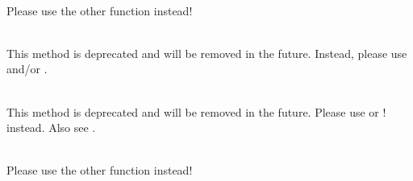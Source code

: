 \begin{DoxyRefList}
\item[{\parbox[t]{\linewidth}{Member \doxylink{class_dcm_transport_connection_a2e586937d38adda2910dd16843e6ae88}{Dcm\+Transport\+Connection::\+dump\+Connection\+Parameters} (STD\+\_\+\+NAMESPACE ostream \&out)}}]\hfill \\
\label{deprecated__deprecated000010}%
%
Please use the other  function instead!  
\item[{\parbox[t]{\linewidth}{Member \doxylink{class_dcm_xfer_aeffc267fe0496ac0c904b59c8cc5d615}{Dcm\+Xfer::\+is\+Encapsulated} () const}}]\hfill \\
\label{deprecated__deprecated000002}%
%
This method is deprecated and will be removed in the future. Instead, please use  and/\+or .  
\item[{\parbox[t]{\linewidth}{Member \doxylink{class_dcm_xfer_aad8803ed279a61cc1ec1f4241f7aae18}{Dcm\+Xfer::\+is\+Not\+Encapsulated} () const}}]\hfill \\
\label{deprecated__deprecated000003}%
%
This method is deprecated and will be removed in the future. Please use  or !  instead. Also see .  
\item[{\parbox[t]{\linewidth}{Member \doxylink{class_dimse_condition_aeba28d4dd3f9e93876f45100aaa331ab}{Dimse\+Condition::\+dump} (\doxylink{class_o_f_condition}{OFCondition} cond, \doxylink{class_o_f_console}{OFConsole} \&console=of\+Console)}}]\hfill \\
\label{deprecated__deprecated000009}%
%
Please use the other  function instead!  
\item[{\parbox[t]{\linewidth}{Member \doxylink{dul_8h_a7b4723b986ca07d682e06f979872e256}{DUL\+\_\+\+Dump\+Connection\+Parameters} (DUL\+\_\+\+ASSOCIATIONKEY \texorpdfstring{$\ast$}{*}association, STD\+\_\+\+NAMESPACE ostream \&outstream)}}]\hfill \\

\end{DoxyRefList}
